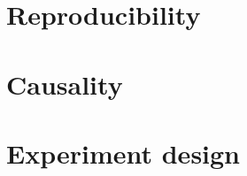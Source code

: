 \documentclass[a4paper,twoside]{book}
\begin{document}

\chapter{Reproducibility}
\label{ch:reproducibility}




\chapter{Causality}
\label{ch:causality}


\chapter{Experiment design}
\label{ch:bandit}


%
%
%
%

\printindex

\appendix







\end{document}
